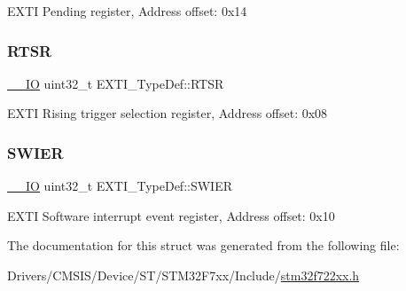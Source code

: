 E\+X\+TI Pending register, Address offset\+: 0x14 \mbox{\label{struct_e_x_t_i___type_def_ac019d211d8c880b327a1b90a06cc0675}} 
\subsubsection{\texorpdfstring{RTSR}{RTSR}}
{\footnotesize\ttfamily \mbox{\hyperlink{core__sc300_8h_aec43007d9998a0a0e01faede4133d6be}{\+\_\+\+\_\+\+IO}} uint32\+\_\+t E\+X\+T\+I\+\_\+\+Type\+Def\+::\+R\+T\+SR}

E\+X\+TI Rising trigger selection register, Address offset\+: 0x08 \mbox{\label{struct_e_x_t_i___type_def_a5c1f538e64ee90918cd158b808f5d4de}} 
\subsubsection{\texorpdfstring{SWIER}{SWIER}}
{\footnotesize\ttfamily \mbox{\hyperlink{core__sc300_8h_aec43007d9998a0a0e01faede4133d6be}{\+\_\+\+\_\+\+IO}} uint32\+\_\+t E\+X\+T\+I\+\_\+\+Type\+Def\+::\+S\+W\+I\+ER}

E\+X\+TI Software interrupt event register, Address offset\+: 0x10 

The documentation for this struct was generated from the following file\+:\begin{DoxyCompactItemize}
\item 
Drivers/\+C\+M\+S\+I\+S/\+Device/\+S\+T/\+S\+T\+M32\+F7xx/\+Include/\mbox{\hyperlink{stm32f722xx_8h}{stm32f722xx.\+h}}\end{DoxyCompactItemize}
